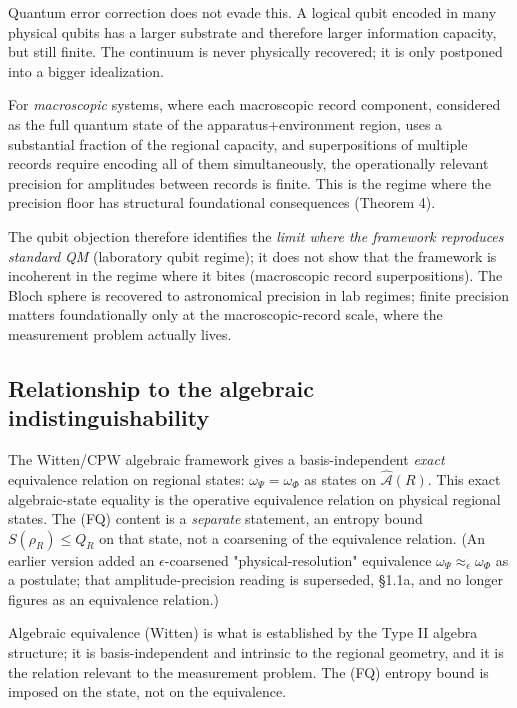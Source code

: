 \documentclass[11pt,a4paper]{article}
\begin{document}
Quantum error correction does not evade this. A logical qubit encoded in many physical qubits has a larger substrate and therefore larger information capacity, but still finite. The continuum is never physically recovered; it is only postponed into a bigger idealization.

For \emph{macroscopic} systems, where each macroscopic record component, considered as the full quantum state of the apparatus+environment region, uses a substantial fraction of the regional capacity, and superpositions of multiple records require encoding all of them simultaneously, the operationally relevant precision for amplitudes between records is finite. This is the regime where the precision floor has structural foundational consequences (Theorem 4).

The qubit objection therefore identifies the \emph{limit where the framework reproduces standard QM} (laboratory qubit regime); it does not show that the framework is incoherent in the regime where it bites (macroscopic record superpositions). The Bloch sphere is recovered to astronomical precision in lab regimes; finite precision matters foundationally only at the macroscopic-record scale, where the measurement problem actually lives.

\subsection{Relationship to the algebraic indistinguishability}

The Witten/CPW algebraic framework gives a basis-independent \emph{exact} equivalence relation on regional states: $\omega_\Psi = \omega_\Phi$ as states on $\hat{\mathcal{A}}(R)$. This exact algebraic-state equality is the operative equivalence relation on physical regional states. The (FQ) content is a \emph{separate} statement, an entropy bound $S(\rho_R) \le Q_R$ on that state, not a coarsening of the equivalence relation. (An earlier version added an $\epsilon$-coarsened "physical-resolution" equivalence $\omega_\Psi \approx_\epsilon \omega_\Phi$ as a postulate; that amplitude-precision reading is superseded, §1.1a, and no longer figures as an equivalence relation.)

Algebraic equivalence (Witten) is what is established by the Type II algebra structure; it is basis-independent and intrinsic to the regional geometry, and it is the relation relevant to the measurement problem. The (FQ) entropy bound is imposed on the state, not on the equivalence.
\end{document}
